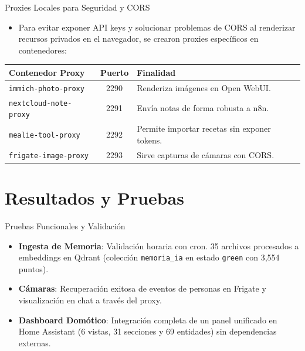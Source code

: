 \documentclass[11pt]{beamer}
\begin{document}
\begin{frame}{Proxies Locales para Seguridad y CORS}
  \begin{itemize}
    \item Para evitar exponer API keys y solucionar problemas de CORS al renderizar recursos privados en el navegador, se crearon proxies específicos en contenedores:
  \end{itemize}
  \begin{table}
    \centering
    \begin{tabular}{lcl}
      \toprule
      Contenedor Proxy & Puerto & Finalidad \\
      \midrule
      \texttt{immich-photo-proxy} & 2290 & Renderiza imágenes en Open WebUI. \\
      \texttt{nextcloud-note-proxy} & 2291 & Envía notas de forma robusta a n8n. \\
      \texttt{mealie-tool-proxy} & 2292 & Permite importar recetas sin exponer tokens. \\
      \texttt{frigate-image-proxy} & 2293 & Sirve capturas de cámaras con CORS. \\
      \bottomrule
    \end{tabular}
  \end{table}
\end{frame}

\section{Resultados y Pruebas}

\begin{frame}{Pruebas Funcionales y Validación}
  \begin{itemize}
    \item \textbf{Ingesta de Memoria}: Validación horaria con cron. 35 archivos procesados a embeddings en Qdrant (colección \texttt{memoria\_ia} en estado \texttt{green} con 3,554 puntos).
    \item \textbf{Cámaras}: Recuperación exitosa de eventos de personas en Frigate y visualización en chat a través del proxy.
    \item \textbf{Dashboard Domótico}: Integración completa de un panel unificado en Home Assistant (6 vistas, 31 secciones y 69 entidades) sin dependencias externas.
  \end{itemize}
\end{frame}
\end{document}
